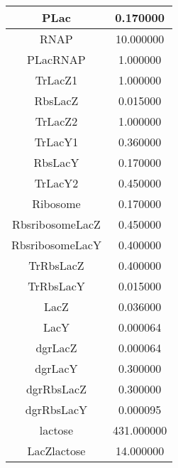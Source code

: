 
 
 
\begin{center} 
\begin{tabular}{ c | c } 
\hline 
  PLac  &  0.170000  \\  \hline 
  RNAP  &  10.000000  \\  \hline 
  PLacRNAP  &  1.000000  \\  \hline 
  TrLacZ1  &  1.000000  \\  \hline 
  RbsLacZ  &  0.015000  \\  \hline 
  TrLacZ2  &  1.000000  \\  \hline 
  TrLacY1  &  0.360000  \\  \hline 
  RbsLacY  &  0.170000  \\  \hline 
  TrLacY2  &  0.450000  \\  \hline 
  Ribosome  &  0.170000  \\  \hline 
  RbsribosomeLacZ  &  0.450000  \\  \hline 
  RbsribosomeLacY  &  0.400000  \\  \hline 
  TrRbsLacZ  &  0.400000  \\  \hline 
  TrRbsLacY  &  0.015000  \\  \hline 
  LacZ  &  0.036000  \\  \hline 
  LacY  &  0.000064  \\  \hline 
  dgrLacZ  &  0.000064  \\  \hline 
  dgrLacY  &  0.300000  \\  \hline 
  dgrRbsLacZ  &  0.300000  \\  \hline 
  dgrRbsLacY  &  0.000095  \\  \hline 
  lactose  &  431.000000  \\  \hline 
  LacZlactose  &  14.000000  \\  \hline 
\end{tabular} 
\end{center} 
